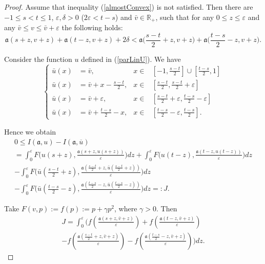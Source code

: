 \documentclass[12pt]{article}
\newcommand{\Real}{\mathbb R}
\newcommand{\eps}{\varepsilon}
\renewcommand{\le}{\leqslant}
\begin{document}
\begin{proof}
Assume that inequality (\ref{almostConvex}) is not satisfied.
Then there are $-1 \le s < t \le 1$, $\eps, \delta > 0$ ($2 \eps < t - s$) and $\bar{v} \in \Real_+$,
such that for any $0 \le z \le \eps$ and any $\bar{v} \le v \le \bar{v} + \eps$ the following holds:
\begin{equation}
\label{notConvex}
\mathfrak a(s + z, v + z) + \mathfrak a(t - z, v + z) + 2 \delta < \mathfrak a\Big(\frac{s - t}{2} + z, v + z \Big) + \mathfrak a\Big(\frac{t - s}{2} - z, v + z \Big).
\end{equation}

Consider the function $u$ defined in (\ref{parLinU}). We have
$$
\left\{
\begin{aligned}
\bar{u}(x) &= \bar{v}, & x \in &[-1, \frac{s - t}{2}] \cup [\frac{t - s}{2}, 1]\\
\bar{u}(x) &= \bar{v} + x - \frac{s - t}{2}, & x \in &[\frac{s - t}{2}, \frac{s - t}{2} + \eps]\\
\bar{u}(x) &= \bar{v} + \eps, & x \in &[\frac{s - t}{2} + \eps, \frac{t - s}{2} - \eps]\\
\bar{u}(x) &= \bar{v} + \frac{t - s}{2} - x, & x \in &[\frac{t - s}{2} - \eps, \frac{t - s}{2}].
\end{aligned}
\right.
$$

Hence we obtain
\begin{multline*}
0 \le I(\mathfrak a, u) - I(\mathfrak a, \overline{u}) \\
=\int_0^{\eps} F\big( u(s + z), \frac{\mathfrak a( s + z, u(s + z) )}{\eps} \big) dz + \int_0^{\eps} F\big( u(t - z), \frac{\mathfrak a(t - z, u(t - z))}{\eps} \big) dz \\
-\int_0^{\eps} F\big( \bar{u}(\frac{s - t}{2} + z), \frac{\mathfrak a( \frac{s - t}{2} + z, \bar{u}(\frac{s - t}{2} + z) )}{\eps} \big) dz \\
-\int_0^{\eps} F\big( \bar{u}(\frac{t - s}{2} - z), \frac{\mathfrak a( \frac{t - s}{2} - z, \bar{u}(\frac{t - s}{2} - z) )}{\eps} \big) dz =: J.
\end{multline*}

Take $F(v, p) := f(p) := p + \gamma p^2$, where $\gamma > 0$.
Then
\begin{multline*}
J = \int_0^{\eps} \big( f(\frac{\mathfrak a(s + z, \bar{v} + z)}{\eps}) + f(\frac{\mathfrak a(t - z, \bar{v} + z)}{\eps}) \\
- f(\frac{\mathfrak a(\frac{s - t}{2} + z, \bar{v} + z)}{\eps}) - f(\frac{\mathfrak a(\frac{t - s}{2} - z, \bar{v} + z)}{\eps}) \big) dz.
\end{multline*}


\end{proof}
\end{document}
